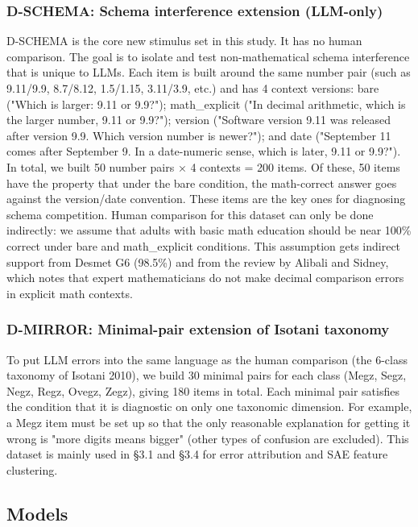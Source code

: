 \subsubsection{D-SCHEMA: Schema interference extension (LLM-only)}

D-SCHEMA is the core new stimulus set in this study. It has no human comparison. The goal is to isolate and test non-mathematical schema interference that is unique to LLMs. Each item is built around the same number pair (such as 9.11/9.9, 8.7/8.12, 1.5/1.15, 3.11/3.9, etc.) and has 4 context versions: bare ("Which is larger: 9.11 or 9.9?"); math\_explicit ("In decimal arithmetic, which is the larger number, 9.11 or 9.9?"); version ("Software version 9.11 was released after version 9.9. Which version number is newer?"); and date ("September 11 comes after September 9. In a date-numeric sense, which is later, 9.11 or 9.9?"). In total, we built 50 number pairs × 4 contexts = 200 items. Of these, 50 items have the property that under the bare condition, the math-correct answer goes against the version/date convention. These items are the key ones for diagnosing schema competition. Human comparison for this dataset can only be done indirectly: we assume that adults with basic math education should be near 100\% correct under bare and math\_explicit conditions. This assumption gets indirect support from Desmet G6 (98.5\%) and from the review by Alibali and Sidney\cite{alibali2015}, which notes that expert mathematicians do not make decimal comparison errors in explicit math contexts.

\subsubsection{D-MIRROR: Minimal-pair extension of Isotani taxonomy}

To put LLM errors into the same language as the human comparison (the 6-class taxonomy of Isotani 2010\cite{isotani2010}), we build 30 minimal pairs for each class (Megz, Segz, Negz, Regz, Ovegz, Zegz), giving 180 items in total. Each minimal pair satisfies the condition that it is diagnostic on only one taxonomic dimension. For example, a Megz item must be set up so that the only reasonable explanation for getting it wrong is "more digits means bigger" (other types of confusion are excluded). This dataset is mainly used in §3.1 and §3.4 for error attribution and SAE feature clustering.

\subsection{Models}

